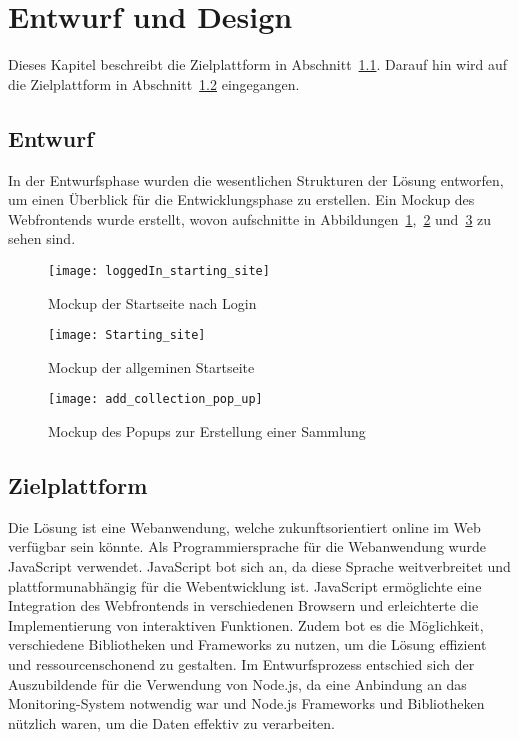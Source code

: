 \section{Entwurf und Design}\label{sec:entwurf-und-design}

Dieses Kapitel beschreibt die Zielplattform in Abschnitt~\ref{subsec:entwurf}.
Darauf hin wird auf die Zielplattform in Abschnitt~\ref{subsec:zielplattform} eingegangen.

\subsection{Entwurf}\label{subsec:entwurf}

In der Entwurfsphase wurden die wesentlichen Strukturen der Lösung entworfen, um einen Überblick für die Entwicklungsphase zu erstellen.
Ein Mockup des Webfrontends wurde erstellt, wovon aufschnitte in Abbildungen~\ref{fig:mockup1},~\ref{fig:mockup2} und~\ref{fig:mockup3} zu sehen sind.

\begin{figure}[h]
    \centering
    \texttt{[image: loggedIn\_starting\_site]}
    \caption{Mockup der Startseite nach Login}
    \label{fig:mockup1}
\end{figure}

\begin{figure}[h]
    \centering
    \texttt{[image: Starting\_site]}
    \caption{Mockup der allgeminen Startseite}
    \label{fig:mockup2}
\end{figure}

\begin{figure}[h]
    \centering
    \texttt{[image: add\_collection\_pop\_up]}
    \caption{Mockup des Popups zur Erstellung einer Sammlung}
    \label{fig:mockup3}
\end{figure}

\subsection{Zielplattform}\label{subsec:zielplattform}

Die Lösung ist eine Webanwendung, welche zukunftsorientiert online im Web verfügbar sein könnte.
Als Programmiersprache für die Webanwendung wurde JavaScript verwendet.
JavaScript bot sich an, da diese Sprache weitverbreitet und plattformunabhängig für die Webentwicklung ist.
JavaScript ermöglichte eine Integration des Webfrontends in verschiedenen Browsern und erleichterte die Implementierung von interaktiven Funktionen.
Zudem bot es die Möglichkeit, verschiedene Bibliotheken und Frameworks zu nutzen, um die Lösung effizient und ressourcenschonend zu gestalten.
Im Entwurfsprozess entschied sich der Auszubildende für die Verwendung von Node.js, da eine Anbindung an das Monitoring-System notwendig war und Node.js Frameworks und Bibliotheken nützlich waren, um die Daten effektiv zu verarbeiten.

